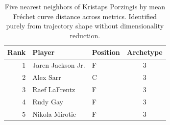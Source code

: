 \begin{table}[htbp]
  \centering\small
  \begin{tabular}{rllc}
    \toprule
    Rank & Player & Position & Archetype \\
    \midrule
    1 & Jaren Jackson Jr. & F & 3 \\
    2 & Alex Sarr & C & 3 \\
    3 & Raef LaFrentz & F & 3 \\
    4 & Rudy Gay & F & 3 \\
    5 & Nikola Mirotic & F & 3 \\
    \bottomrule
  \end{tabular}
  \caption{Five nearest neighbors of Kristaps Porzingis by mean Fr\'{e}chet curve distance across metrics. Identified purely from trajectory shape without dimensionality reduction.}
  \label{tab:Kristaps_Porzingis_frechet_curve_neighbors}
\end{table}

